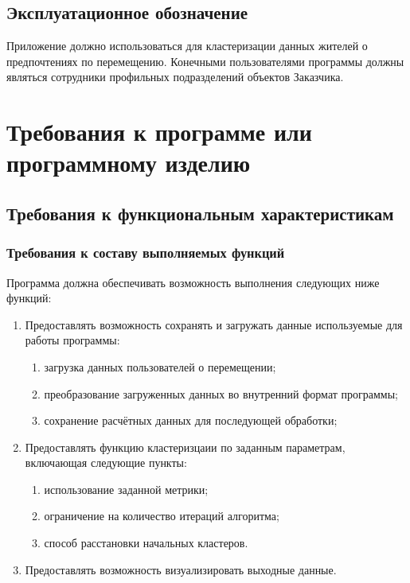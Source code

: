 \section{Эксплуатационное обозначение}
Приложение должно использоваться для кластеризации данных жителей о предпочтениях по перемещению. Конечными пользователями программы должны являться сотрудники профильных подразделений объектов Заказчика.

\chapter{Требования к программе или программному изделию}
\section{Требования к функциональным характеристикам}
\subsection{Требования к составу выполняемых функций}
Программа должна обеспечивать возможность выполнения следующих ниже функций:
\begin{enumerate}
    \item Предоставлять возможность сохранять и загружать данные используемые для работы программы:
    \begin{enumerate}
        \item загрузка данных пользователей о перемещении;
        \item преобразование загруженных данных во внутренний формат программы;
        \item сохранение расчётных данных для последующей обработки;
    \end{enumerate}
    \item Предоставлять функцию кластеризцаии по заданным параметрам, включающая следующие пункты:
    \begin{enumerate}
        \item использование заданной метрики;
        \item ограничение на количество итераций алгоритма;
        \item способ расстановки начальных кластеров.
    \end{enumerate}
    \item Предоставлять возможность визуализировать выходные данные.
\end{enumerate}

